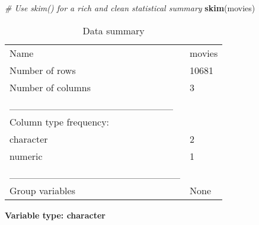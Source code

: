 \documentclass[
]{article}
\newenvironment{Shaded}{\begin{snugshade}}{\end{snugshade}}
\newcommand{\CommentTok}[1]{\textcolor[rgb]{0.56,0.35,0.01}{\textit{#1}}}
\newcommand{\FunctionTok}[1]{\textcolor[rgb]{0.13,0.29,0.53}{\textbf{#1}}}
\newcommand{\NormalTok}[1]{#1}
\begin{document}
\begin{Shaded}
\begin{Highlighting}[]
\CommentTok{\# Use skim() for a rich and clean statistical summary}
\FunctionTok{skim}\NormalTok{(movies)}
\end{Highlighting}
\end{Shaded}

\begin{longtable}[]{@{}ll@{}}
\caption{Data summary}\tabularnewline
\toprule\noalign{}
\endfirsthead
\endhead
\bottomrule\noalign{}
\endlastfoot
Name & movies \\
Number of rows & 10681 \\
Number of columns & 3 \\
\_\_\_\_\_\_\_\_\_\_\_\_\_\_\_\_\_\_\_\_\_\_\_ & \\
Column type frequency: & \\
character & 2 \\
numeric & 1 \\
\_\_\_\_\_\_\_\_\_\_\_\_\_\_\_\_\_\_\_\_\_\_\_\_ & \\
Group variables & None \\
\end{longtable}

\textbf{Variable type: character}
\end{document}
